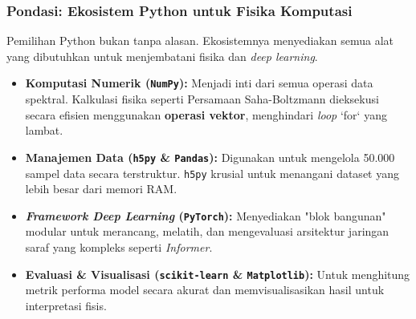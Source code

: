 \documentclass{beamer}
\begin{document}
\begin{frame}
  \frametitle{Pondasi: Ekosistem Python untuk Fisika Komputasi}
  
  Pemilihan Python bukan tanpa alasan. Ekosistemnya menyediakan semua alat yang dibutuhkan untuk menjembatani fisika dan \textit{deep learning}.
  
  \begin{itemize}
    \item \textbf{Komputasi Numerik (\texttt{NumPy}):} 
    Menjadi inti dari semua operasi data spektral. Kalkulasi fisika seperti Persamaan Saha-Boltzmann dieksekusi secara efisien menggunakan \textbf{operasi vektor}, menghindari \textit{loop} `for` yang lambat.
    
    \item \textbf{Manajemen Data (\texttt{h5py} \& \texttt{Pandas}):} 
    Digunakan untuk mengelola 50.000 sampel data secara terstruktur. \texttt{h5py} krusial untuk menangani dataset yang lebih besar dari memori RAM.
    
    \item \textbf{\textit{Framework Deep Learning} (\texttt{PyTorch}):} 
    Menyediakan "blok bangunan" modular untuk merancang, melatih, dan mengevaluasi arsitektur jaringan saraf yang kompleks seperti \textit{Informer}.
    
    \item \textbf{Evaluasi \& Visualisasi (\texttt{scikit-learn} \& \texttt{Matplotlib}):} 
    Untuk menghitung metrik performa model secara akurat dan memvisualisasikan hasil untuk interpretasi fisis.
  \end{itemize}
\end{frame}
\end{document}
